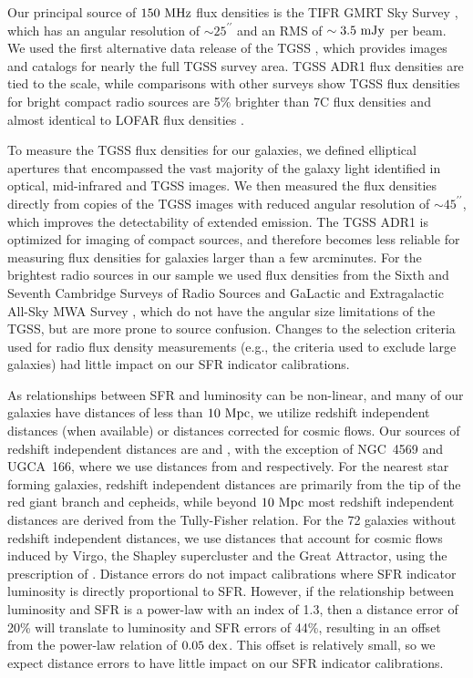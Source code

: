 \documentclass[preprint]{aastex61}
\begin{document}
Our principal source of $150~{\rm MHz}$ flux densities is the TIFR GMRT Sky Survey \citep[TGSS; e.g.,][]{bag11,gop12,sir14}, which has an angular resolution of $\sim 25^{\prime\prime}$ and an RMS of $\sim 3.5~{\rm mJy}$ per beam. We used the first alternative data release of the TGSS \citep[TGSS ADR1;][]{int16}, which provides images and catalogs for nearly the full TGSS survey area. TGSS ADR1 flux densities are tied to the \citet{sca12} scale, while comparisons with other surveys show TGSS flux densities for bright compact radio sources are 5\% brighter than 7C flux densities and almost identical to LOFAR flux densities \citep{int16}. 

To measure the TGSS flux densities for our galaxies, we defined elliptical apertures that encompassed the vast majority of the galaxy light identified in optical, mid-infrared and TGSS images. We then measured the flux densities directly from copies of the TGSS images with reduced angular resolution of  $\sim 45^{\prime\prime}$, which improves the detectability of extended emission. The TGSS ADR1 is optimized for imaging of compact sources, and therefore becomes less reliable for measuring flux densities for galaxies larger than a few arcminutes. For the brightest radio sources in our sample we used flux densities from the Sixth and Seventh Cambridge Surveys of Radio Sources \citep[6C, 7C;][]{6c1,6c2,6c3,6c4,6c5,6c6,7c} and GaLactic and Extragalactic All-Sky MWA Survey \citep[GLEAM;][]{way15,hur16}, which do not have the angular size limitations of the TGSS, but are more prone to source confusion. Changes to the selection criteria used for radio flux density measurements (e.g., the criteria used to exclude large galaxies) had little impact on our SFR indicator calibrations.

As relationships between SFR and luminosity can be non-linear, and many of our galaxies have distances of less than $10~{\rm Mpc}$, we utilize redshift independent distances (when available) or distances corrected for cosmic flows. Our sources of redshift independent distances are \citet{tul13} and \citet{sor14}, with the exception of NGC~4569 and UGCA~166, where we use distances from \citet{cor08} and \citet{mar10} respectively. For the nearest star forming galaxies, redshift independent distances are primarily from the tip of the red giant branch and cepheids, while beyond $10~{\rm Mpc}$ most redshift independent distances are derived from the Tully-Fisher relation. For the 72 galaxies without redshift independent distances, we use distances that account for cosmic flows induced by Virgo, the Shapley supercluster and the Great Attractor, using the prescription of \citet{mou00}.  Distance errors do not impact calibrations where SFR indicator luminosity is directly proportional to SFR. However, if the relationship between luminosity and SFR is a power-law with an index of 1.3, then a distance error of 20\% will translate to luminosity and SFR errors of 44\%, resulting in an offset from the power-law relation of $0.05~{\rm dex}$. This offset is relatively small, so we expect distance errors to have little impact on our SFR indicator calibrations. 
\end{document}
